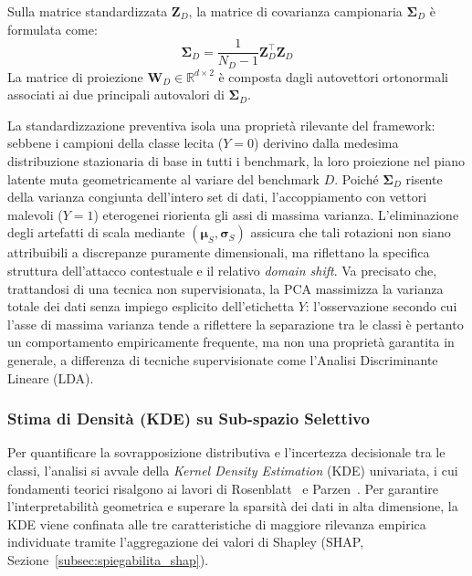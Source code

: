 Sulla matrice standardizzata $\mathbf{Z}_D$, la matrice di covarianza campionaria $\boldsymbol{\Sigma}_D$ è formulata come:
\begin{equation}
    \boldsymbol{\Sigma}_D = \frac{1}{N_D - 1} \mathbf{Z}_D^\top \mathbf{Z}_D
    \label{eq:cov_matrix}
\end{equation}
La matrice di proiezione $\mathbf{W}_D \in \mathbb{R}^{d \times 2}$ è composta dagli autovettori ortonormali associati ai due principali autovalori di $\boldsymbol{\Sigma}_D$.

La standardizzazione preventiva isola una proprietà rilevante del framework: sebbene i campioni della classe lecita ($Y=0$) derivino dalla medesima distribuzione stazionaria di base in tutti i benchmark, la loro proiezione nel piano latente muta geometricamente al variare del benchmark $D$. Poiché $\boldsymbol{\Sigma}_D$ risente della varianza congiunta dell'intero set di dati, l'accoppiamento con vettori malevoli ($Y=1$) eterogenei riorienta gli assi di massima varianza. L'eliminazione degli artefatti di scala mediante $(\boldsymbol{\mu}_S, \boldsymbol{\sigma}_S)$ assicura che tali rotazioni non siano attribuibili a discrepanze puramente dimensionali, ma riflettano la specifica struttura dell'attacco contestuale e il relativo \textit{domain shift}. Va precisato che, trattandosi di una tecnica non supervisionata, la PCA massimizza la varianza totale dei dati senza impiego esplicito dell'etichetta $Y$: l'osservazione secondo cui l'asse di massima varianza tende a riflettere la separazione tra le classi è pertanto un comportamento empiricamente frequente, ma non una proprietà garantita in generale, a differenza di tecniche supervisionate come l'Analisi Discriminante Lineare (LDA).

\subsubsection{Stima di Densità (KDE) su Sub-spazio Selettivo}
\label{subsubsec:kde_features}
Per quantificare la sovrapposizione distributiva e l'incertezza decisionale tra le classi, l'analisi si avvale della \textit{Kernel Density Estimation} (KDE) univariata, i cui fondamenti teorici risalgono ai lavori di Rosenblatt~\cite{rosenblatt1956} e Parzen~\cite{parzen1962}. Per garantire l'interpretabilità geometrica e superare la sparsità dei dati in alta dimensione, la KDE viene confinata alle tre caratteristiche di maggiore rilevanza empirica individuate tramite l'aggregazione dei valori di Shapley (SHAP, Sezione~\ref{subsec:spiegabilita_shap}).

